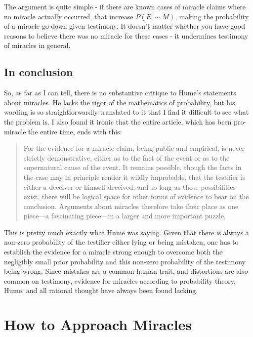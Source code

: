 \documentclass{tufte-book}
\begin{document}
The argument is quite simple - if there are known cases of miracle
claims where no miracle actually occurred, that increase
\(P(E|\sim\!M)\), making the probability of a miracle go down given
testimony. It doesn't matter whether you have good reasons to believe
there was no miracle for these cases - it undermines testimony of
miracles in general.

\subsection{In conclusion}\label{in-conclusion}

So, as far as I can tell, there is no substantive critique to Hume's
statements about miracles. He lacks the rigor of the mathematics of
probability, but his wording is so straightforwardly translated to it
that I find it difficult to see what the problem is. I also found it
ironic that the entire article, which has been pro-miracle the entire
time, ends with this:

\begin{quote}
For the evidence for a miracle claim, being public and empirical, is
never strictly demonstrative, either as to the fact of the event or as
to the supernatural cause of the event. It remains possible, though the
facts in the case may in principle render it wildly improbable, that the
testifier is either a deceiver or himself deceived; and so long as those
possibilities exist, there will be logical space for other forms of
evidence to bear on the conclusion. Arguments about miracles therefore
take their place as one piece---a fascinating piece---in a larger and
more important puzzle.
\end{quote}

This is pretty much exactly what Hume was saying. Given that there is
always a non-zero probability of the testifier either lying or being
mistaken, one has to establish the evidence for a miracle strong enough
to overcome both the negligibly small prior probability and this
non-zero probability of the testimony being wrong. Since mistakes are a
common human trait, and distortions are also common on testimony,
evidence for miracles according to probability theory, Hume, and all
rational thought have always been found lacking.

\section{How to Approach Miracles}\label{how-to-approach-miracles}
\end{document}
